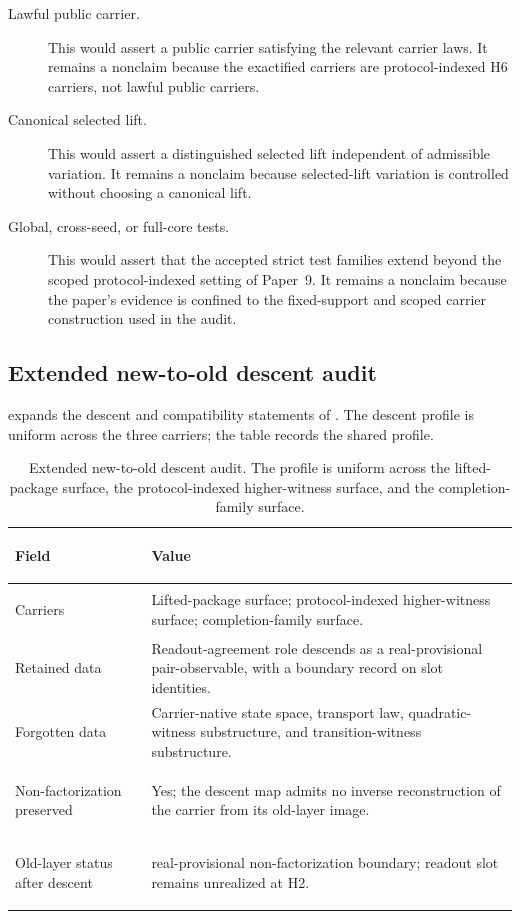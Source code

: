 \documentclass[11pt]{article}
\newcommand{\OldLayer}{H2}
\newcommand{\NewLayer}{H6}
\newcommand{\PaperNine}{Paper~9}
\newcommand{\OldLayerStatus}{real-provisional non-factorization boundary}
\theoremstyle{definition}
\begin{document}
\begin{description}
\item[Lawful public carrier.]
This would assert a public carrier satisfying the relevant carrier laws.  It
remains a nonclaim because the exactified carriers are protocol-indexed
\NewLayer{} carriers, not lawful public carriers.

\item[Canonical selected lift.]
This would assert a distinguished selected lift independent of admissible
variation.  It remains a nonclaim because selected-lift variation is controlled
without choosing a canonical lift.

\item[Global, cross-seed, or full-core tests.]
This would assert that the accepted strict test families extend beyond the
scoped protocol-indexed setting of \PaperNine{}.  It remains a nonclaim because
the paper's evidence is confined to the fixed-support and scoped carrier
construction used in the audit.
\end{description}

\subsection{Extended new-to-old descent audit}\label{subsec:extended-table-descent-audit}

 expands the descent and compatibility
statements of
.
The descent profile is uniform across the three carriers; the table records the
shared profile.

\begin{table}[tbp]
\centering
\small
\caption{Extended new-to-old descent audit.  The profile is uniform across the
lifted-package surface, the protocol-indexed higher-witness surface, and the
completion-family surface.}
\label{tab:extended-descent-audit}
\begin{tabularx}{\textwidth}{@{}>{\bfseries\raggedright\arraybackslash}p{}X@{}}
\toprule
Field & Value \\
\midrule
Carriers
  & Lifted-package surface; protocol-indexed higher-witness surface; completion-family surface. \\
Retained data
  & Readout-agreement role descends as a real-provisional pair-observable, with a boundary record on slot identities. \\
Forgotten data
  & Carrier-native state space, transport law, quadratic-witness substructure, and transition-witness substructure. \\
Non-factorization preserved
  & Yes; the descent map admits no inverse reconstruction of the carrier from its old-layer image. \\
Old-layer status after descent
  & \OldLayerStatus{}; readout slot remains unrealized at \OldLayer{}. \\
\bottomrule
\end{tabularx}
\end{table}
\end{document}
